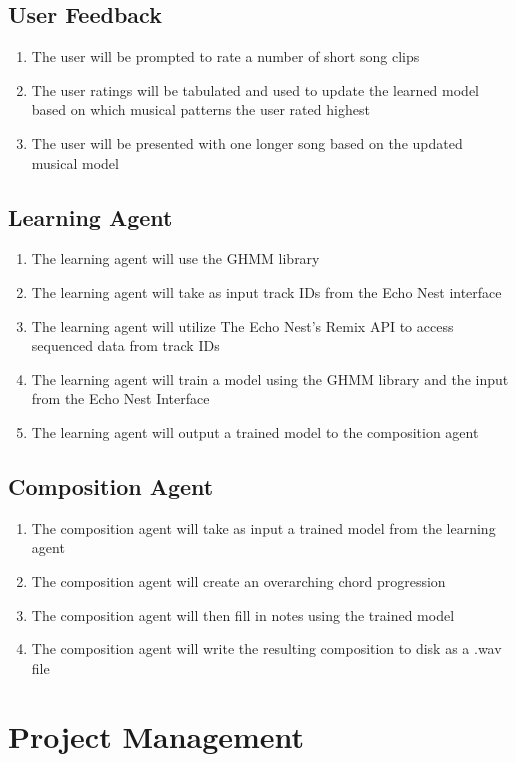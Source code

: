 \documentclass{article}
\begin{document}
\subsection{User Feedback}
\begin{enumerate}
\item The user will be prompted to rate a number of short song clips
\item The user ratings will be tabulated and used to update the learned model based on which musical patterns the user rated highest
\item The user will be presented with one longer song based on the updated musical model
\end{enumerate}

\subsection{Learning Agent}
\begin{enumerate}
\item The learning agent will use the GHMM library
\item The learning agent will take as input track IDs from the Echo Nest interface
\item The learning agent will utilize The Echo Nest's Remix API \cite{Remix} to access sequenced data from track IDs
\item The learning agent will train a model \cite{GHMM} using the GHMM library and the input from the Echo Nest Interface
\item The learning agent will output a trained model to the composition agent
\end{enumerate}

\subsection{Composition Agent}
\begin{enumerate}
\item The composition agent will take as input a trained model from the learning agent
\item The composition agent will create an overarching chord progression
\item The composition agent will then fill in notes using the trained model
\item The composition agent will write the resulting composition to disk as a .wav file
\end{enumerate}

\section{Project Management}
\end{document}
